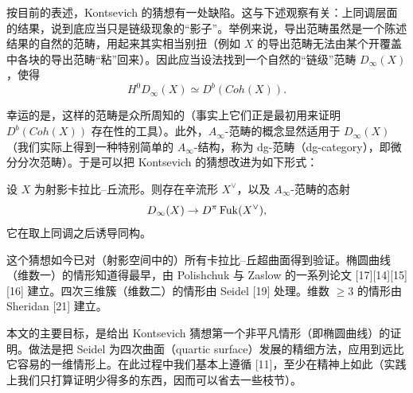 
按目前的表述，Kontsevich 的猜想有一处缺陷。这与下述观察有关：上同调层面的结果，说到底应当只是链级现象的“影子”。举例来说，导出范畴虽然是一个陈述结果的自然的范畴，用起来其实相当别扭（例如 $X$ 的导出范畴无法由某个开覆盖中各块的导出范畴“粘”回来）。因此应当设法找到一个自然的“链级”范畴 $D_\infty(X)$，使得
\[
  H^0D_\infty(X) \simeq D^b(Coh(X)).
\]


幸运的是，这样的范畴是众所周知的（事实上它们正是最初用来证明 $D^b(Coh(X))$ 存在性的工具）。此外，$A_\infty$-范畴的概念显然适用于 $D_\infty(X)$（我们实际上得到一种特别简单的 $A_\infty$-结构，称为 dg-范畴（dg-category），即微分分次范畴）。于是可以把 Kontsevich 的猜想改进为如下形式：

\begin{conjecture*}[Kontsevich，链级]
设 $X$ 为射影卡拉比–丘流形。则存在辛流形 $X^\vee$，以及 $A_\infty$-范畴的态射
\[
  D_\infty(X) \to D^\pi\operatorname{Fuk}(X^\vee),
\]
它在取上同调之后诱导同构。
\end{conjecture*}

这个猜想如今已对（射影空间中的）所有卡拉比–丘超曲面得到验证。椭圆曲线（维数一）的情形知道得最早，由 Polishchuk 与 Zaslow 的一系列论文 [17][14][15][16] 建立。四次三维簇（维数二）的情形由 Seidel [19] 处理。维数 $\ge 3$ 的情形由 Sheridan [21] 建立。


本文的主要目标，是给出 Kontsevich 猜想第一个非平凡情形（即椭圆曲线）的证明。做法是把 Seidel 为四次曲面（quartic surface）发展的精细方法，应用到远比它容易的一维情形上。在此过程中我们基本上遵循 [11]，至少在精神上如此（实践上我们只打算证明少得多的东西，因而可以省去一些枝节）。

